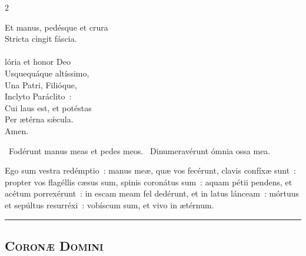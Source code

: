\documentclass[9pt,twoside]{extarticle}
\begin{document}
\begin{multicols}{2}
{{Et manus, pedésque et crura\\
Stricta cingit fáscia.\\
\\
lória et honor Deo\\
Usquequáque altíssimo,\\
Una Patri, Filióque,\\
Inclyto Paráclito~:\\
Cui laus est, et potéstas\\
Per ætérna sǽcula.\\
Amen.
\begin{tightlist}{}
\item {}~Fodérunt manus meas et pedes meos. ~Dinumeravérunt ómnia ossa mea.
\item {} Ego sum vestra redémptio~: manus meæ, quæ vos fecérunt, clavis confíxæ sunt~: propter vos flagéllis cæsus sum, spinis coronátus sum~: aquam pétii pendens, et acétum porrexérunt~: in escam meam fel dedérunt, et in latus lánceam~: mórtuus et sepúltus resurréxi~: vobíscum sum, et vivo in ætérnum.
\end{tightlist}

\begin{center}\textcolor{red}{\rule{\linewidth}{0.5pt}} \end{center}

%
\subsubsection*{\center {}}
\subsection*{\center \textsc{Coronæ Domini}}
\subsubsection*{\center {}}
\begin{tightlist}{}
\item {}
\item {}
\end{tightlist}

}}
\end{multicols}
\end{document}
